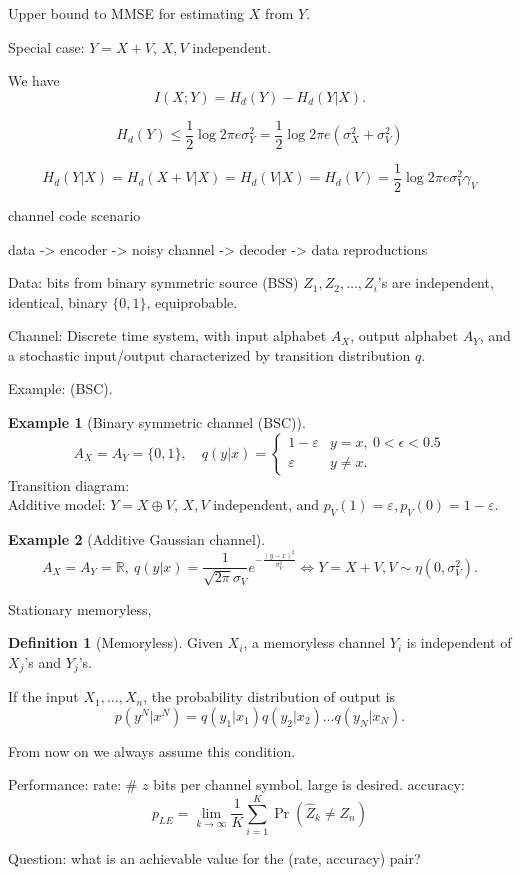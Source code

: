 \documentclass{report}
\newcommand{\R}{\mathbb{R}}
\theoremstyle{definition}
\newtheorem{definition}{Definition}[section]
\newtheorem{example}{Example}[section]
\theoremstyle{remark}
\numberwithin{equation}{section}
\begin{document}
Upper bound to MMSE for estimating $X$ from $Y$.

Special case: $Y = X + V$, $X, V$ independent.

We have \[I(X; Y) = H_d(Y) - H_d(Y|X).\]

\[H_d(Y) \leq \frac{1}{2}\log2\pi e\sigma_Y^2=\frac{1}{2}\log2\pi e(\sigma_X^2 + \sigma_V^2)\]

\[
  H_d(Y|X) = H_d(X + V|X) = H_d(V|X) = H_d(V) = \frac{1}{2}\log 2\pi e \sigma_V^2\gamma_V
\]


channel code scenario

data -> encoder -> noisy channel -> decoder -> data reproductions

Data: bits from binary symmetric source (BSS)
$Z_1, Z_2, \ldots, Z_i$'s are independent, identical, binary $\{0, 1\}$, equiprobable. 

Channel: Discrete time system, with input alphabet $A_X$, output alphabet $A_Y$, and a stochastic input/output characterized by transition distribution $q$.

Example:  (BSC).

\begin{example}[Binary symmetric channel (BSC)]
  \[A_X = A_Y = \{0, 1\},\quad  q(y|x) = \begin{cases}
    1 - \varepsilon & y = x,\ 0 < \epsilon < 0.5 \\
    \varepsilon & y \neq x.
  \end{cases}\]
  Transition diagram:
  \[\]
  Additive model: $Y = X \oplus V$, $X, V$ independent, and $p_V(1) = \varepsilon, p_V(0) = 1 - \varepsilon$.
\end{example}

\begin{example}[Additive Gaussian channel]
  \[A_X = A_Y = \R, \ q(y|x) = \frac{1}{\sqrt{2\pi}\sigma_V}e^{-\frac{(y-x)^2}{\sigma_V^2}} \iff  Y = X + V, V \sim \eta(0, \sigma_V^2).\]
\end{example}

Stationary memoryless,

\begin{definition}[Memoryless]
  Given $X_i$, a memoryless channel $Y_i$ is independent of $X_j$'s and $Y_j$'s.
\end{definition}

If the input $X_1, \ldots, X_n$, the probability distribution of output is \[
  p(y^N | x^N) = q(y_1|x_1)q(y_2|x_2)\ldots q(y_N|x_N).
\]

From now on we always assume this condition.

Performance: 
rate: \# $z$ bits per channel symbol. large is desired.
accuracy: \[p_{LE} = \lim_{k \to \infty}\frac{1}{K}\sum_{i=1}^K \Pr(\hat{Z}_k \neq Z_n)\]

Question: what is an achievable value for the (rate, accuracy) pair?
\end{document}
